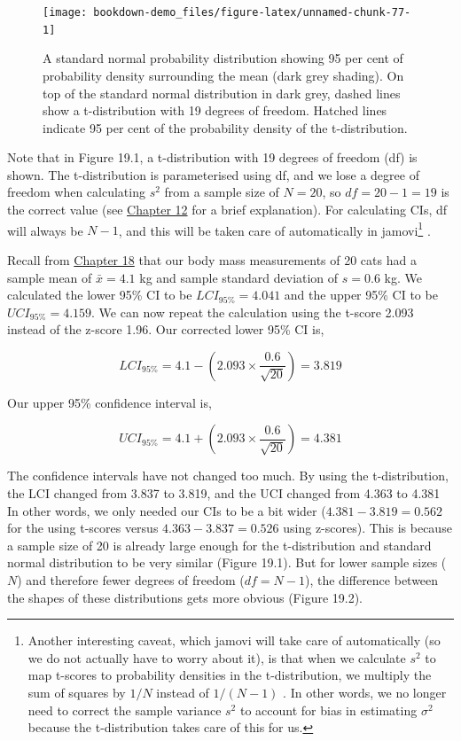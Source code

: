 \documentclass[
  openany]{krantz}
\begin{document}
\begin{figure}
\texttt{[image: bookdown-demo\_files/figure-latex/unnamed-chunk-77-1]} \caption{A standard normal probability distribution showing 95 per cent of probability density surrounding the mean (dark grey shading). On top of the standard normal distribution in dark grey, dashed lines show a t-distribution with 19 degrees of freedom. Hatched lines indicate 95 per cent of the probability density of the t-distribution.}\label{fig:unnamed-chunk-77}
\end{figure}

Note that in Figure 19.1, a t-distribution with 19 degrees of freedom (df) is shown.
The t-distribution is parameterised using df, and we lose a degree of freedom when calculating \(s^{2}\) from a sample size of \(N = 20\), so \(df = 20 - 1 = 19\) is the correct value (see \protect\hyperlink{Chapter_12}{Chapter 12} for a brief explanation).
For calculating CIs, df will always be \(N - 1\), and this will be taken care of automatically in jamovi\footnote{Another interesting caveat, which jamovi will take care of automatically (so we do not actually have to worry about it), is that when we calculate \(s^{2}\) to map t-scores to probability densities in the t-distribution, we multiply the sum of squares by \(1/N\) instead of \(1/(N-1)\) \citep{Sokal1995}. In other words, we no longer need to correct the sample variance \(s^{2}\) to account for bias in estimating \(\sigma^{2}\) because the t-distribution takes care of this for us.} \citep{Jamovi2022}.

Recall from \protect\hyperlink{Chapter_18}{Chapter 18} that our body mass measurements of 20 cats had a sample mean of \(\bar{x} = 4.1\) kg and sample standard deviation of \(s = 0.6\) kg. We calculated the lower 95\% CI to be \(LCI_{95\%} = 4.041\) and the upper 95\% CI to be \(UCI_{95\%} = 4.159\). We can now repeat the calculation using the t-score 2.093 instead of the z-score 1.96.
Our corrected lower 95\% CI is,

\[LCI_{95\%} = 4.1 - \left(2.093 \times \frac{0.6}{\sqrt{20}}\right) = 3.819\]

Our upper 95\% confidence interval is,

\[UCI_{95\%} = 4.1 + \left(2.093 \times \frac{0.6}{\sqrt{20}}\right) = 4.381\]

The confidence intervals have not changed too much.
By using the t-distribution, the LCI changed from 3.837 to 3.819, and the UCI changed from 4.363 to 4.381
In other words, we only needed our CIs to be a bit wider (\(4.381 - 3.819 = 0.562\) for the using t-scores versus \(4.363 - 3.837 = 0.526\) using z-scores).
This is because a sample size of 20 is already large enough for the t-distribution and standard normal distribution to be very similar (Figure 19.1).
But for lower sample sizes (\(N\)) and therefore fewer degrees of freedom (\(df = N - 1\)), the difference between the shapes of these distributions gets more obvious (Figure 19.2).
\end{document}
